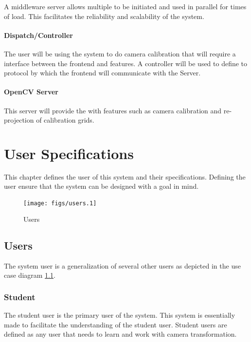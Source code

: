 \documentclass[11pt]{report}
\begin{document}
A middleware server allows multiple  to be initiated and used in parallel for times of load. This facilitates the reliability and scalability of the system. 

\subsubsection{Dispatch/Controller}


The user will be using the system to do camera calibration that will require a interface between the frontend and  features. A controller will be used to define to protocol by which the frontend will communicate with the  Server. 

\subsubsection{OpenCV Server}

This server will provide the  with  features such as camera calibration and re-projection of calibration grids.

\chapter{User Specifications}

This chapter defines the user of this system and their specifications. Defining the user ensure that the system can be designed with a  goal in mind. 

\begin{figure}[htp]
\centering
\texttt{[image: figs/users.1]}
\caption{Users}
\label{fig:uo}
\end{figure}

\section{Users} 

The system user is a generalization of several other users as depicted in the use case diagram \ref{fig:uo}.  

\subsection{Student}

The student user is the primary user of the system. This system is essentially made to facilitate the understanding of the student user. Student users are defined as any user that needs to learn and work with camera transformation.  
\end{document}

